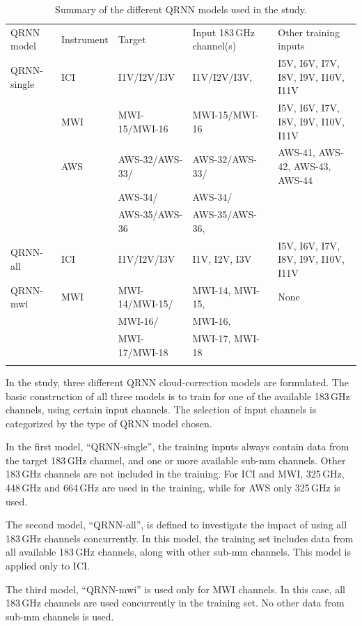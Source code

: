 \documentclass[amt, manuscript]{copernicus}
\begin{document}
\begin{table}[t]
	\caption{Summary of the different QRNN models used in the study.}
	\label{tab:QRNN_models}
	\begin{tabular}{lllll}
		\tophline
		QRNN model & Instrument & Target & Input 183\,GHz channel(s) &Other training inputs \\
		\middlehline
		QRNN-single &  ICI 	& I1V/I2V/I3V 	& I1V/I2V/I3V, & I5V, I6V, I7V, I8V, I9V, I10V, I11V\\
		\cline{2-5}
		&  MWI 	& MWI-15/MWI-16 & MWI-15/MWI-16	& I5V, I6V, I7V, I8V, I9V, I10V, I11V \\
		\cline{2-5}
		& AWS	& AWS-32/AWS-33/ &  AWS-32/AWS-33/ & AWS-41, AWS-42, AWS-43, AWS-44\\
		&		& AWS-34/		 &	AWS-34/		   & \\
		&		& AWS-35/AWS-36	 & AWS-35/AWS-36,  &\\
		\cline{1-5}
		QRNN-all &  ICI 	& I1V/I2V/I3V 	& I1V, I2V, I3V & I5V, I6V, I7V, I8V, I9V, I10V, I11V\\
		\cline{1-5}
		QRNN-mwi &  MWI		& MWI-14/MWI-15/ &  MWI-14, MWI-15, & None 	\\	
		&			& MWI-16/		 &  MWI-16, & \\
		&			& MWI-17/MWI-18	 &  MWI-17, MWI-18  &\\					
		\bottomhline
	\end{tabular}
	\belowtable{} %
\end{table}						

In the study, three different QRNN cloud-correction models are formulated. The basic construction of all three models is to train for one of the available 183\,GHz channels, using certain input channels. The selection of input channels is categorized by the type of QRNN model chosen.

In the first model, ``QRNN-single'', the training inputs always contain data from the target 183\,GHz channel, and one or more available sub-mm channels. Other 183\,GHz channels are not included in the training. For ICI and MWI, 325\,GHz, 448\,GHz and 664\,GHz are used in the training, while for AWS only 325\,GHz is used. 
 
The second model, ``QRNN-all'', is defined to investigate the  impact of using all 183\,GHz channels concurrently. In this model, the training set includes data from all available 183\,GHz channels, along with other sub-mm channels. This model is applied only to ICI.

The third model, ``QRNN-mwi'' is used only for MWI channels. In this case, all 183\,GHz channels are used concurrently in the training set. No other data from sub-mm channels is used.
\end{document}
